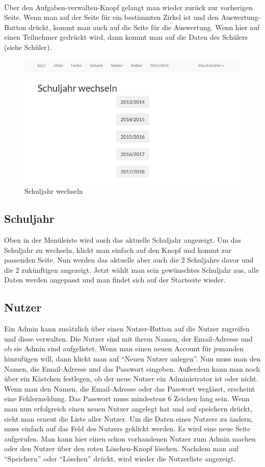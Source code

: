 \\Über den Aufgaben-verwalten-Knopf gelangt man wieder zurück zur vorherigen Seite. Wenn man auf der Seite für ein bestimmten Zirkel ist und den Auswertung-Button drückt, kommt man auch auf die Seite für die Auswertung. Wenn hier auf einen Teilnehmer gedrückt wird, dann kommt man auf die Daten des Schülers (siehe Schüler).

\begin{figure}[ht]
	\centering
	\includegraphics[scale=.40]{bilder/Schuljahr.png}
	\caption{Schuljahr wechseln}
\end{figure}

\subsection{Schuljahr}
Oben in der Menüleiste wird auch das aktuelle Schuljahr angezeigt. Um das Schuljahr zu wechseln, klickt man einfach auf den Knopf und kommt zur passenden Seite. Nun werden das aktuelle aber auch die 2 Schuljahre davor und die 2 zukünftigen angezeigt. Jetzt wählt man sein gewünschtes Schuljahr aus, alle Daten werden angepasst und man findet sich auf der Startseite wieder.


\subsection{Nutzer}
Ein Admin kann zusätzlich über einen Nutzer-Button auf die Nutzer zugreifen und diese verwalten. Die Nutzer sind mit ihrem Namen, der Email-Adresse und ob sie Admin sind aufgelistet. Wenn man einen neuen Account für jemanden hinzufügen will, dann klickt man auf "`Neuen Nutzer anlegen"'. Nun muss man den Namen, die Email-Adresse und das Passwort eingeben. Außerdem kann man noch über ein Kästchen festlegen, ob der neue Nutzer ein Administrator ist oder nicht. Wenn man den Namen, die Email-Adresse oder das Passwort weglässt, erscheint eine Fehlermeldung. Das Passwort muss mindestens 6 Zeichen lang sein. Wenn man nun erfolgreich einen neuen Nutzer angelegt hat und auf speichern drückt, sieht man erneut die Liste aller Nutzer. Um die Daten eines Nutzers zu ändern, muss einfach auf das Feld des Nutzers geklickt werden. Es wird eine neue Seite aufgerufen. Man kann hier einen schon vorhandenen Nutzer zum Admin machen oder den Nutzer über den roten Löschen-Knopf löschen. Nachdem man auf "`Speichern"' oder "`Löschen"' drückt, wird wieder die Nutzerliste angezeigt. 

